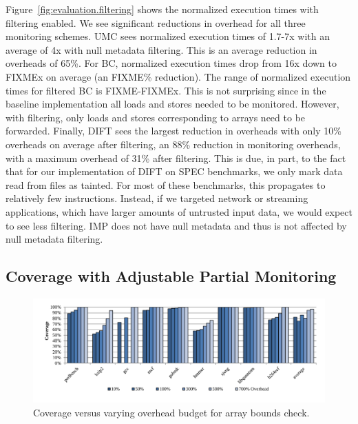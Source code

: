 Figure~\ref{fig:evaluation.filtering} shows the
normalized execution times with filtering enabled. We see significant
reductions in overhead for all three monitoring schemes. UMC sees normalized
execution times of 1.7-7x with an average of 4x with null metadata filtering.
This is an average reduction in overheads of 65\%. For BC, normalized execution
times drop from 16x down to FIXMEx on average (an FIXME\% reduction). The range of normalized execution
times for filtered BC is FIXME-FIXMEx. This is not surprising since in the baseline
implementation all loads and stores needed to be monitored. However, with
filtering, only loads and stores corresponding to arrays need to be forwarded.
Finally, DIFT sees the largest reduction in overheads with only 10\% overheads
on average after filtering, an 88\% reduction in monitoring overheads, with a
maximum overhead of 31\% after filtering. This is due, in part, to the fact
that
for our implementation of DIFT on SPEC
benchmarks, we only mark data read from files as tainted. For most of these
benchmarks, this propagates to relatively few instructions. Instead, if we
targeted network or streaming applications, which have larger amounts of
untrusted input data, we would expect to see less filtering. IMP does not have
null metadata and thus is not affected by null metadata filtering.

\subsection{Coverage with Adjustable Partial Monitoring}

\begin{figure}
  \begin{center}
    \includegraphics[width=\linewidth]{figs/data_bc_sweep.pdf}
    \vspace{-0.2in}
    \caption{Coverage versus varying overhead budget for array bounds check.}
    \label{fig:evaluation.bc_sweep}
    \vspace{-0.2in}
  \end{center}
\end{figure}

